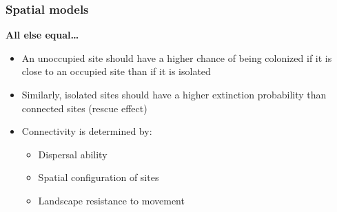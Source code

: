 \documentclass[color=usenames,dvipsnames]{beamer}\usepackage[]{graphicx}\usepackage[]{xcolor}
\begin{document}
\begin{frame}
  \frametitle{Spatial models}
  \large
  {\bf All else equal\dots}
  \begin{itemize}%
    \item An unoccupied site should have a higher chance of being
      colonized if it is close to an occupied site than if it is isolated
    \item<2-> Similarly, isolated sites should have a higher extinction
      probability than connected sites (rescue effect)
    \item<3-> Connectivity is determined by:
      \begin{itemize}
        \large
        \item<4-> Dispersal ability
        \item<4-> Spatial configuration of sites
        \item<4-> Landscape resistance to movement
      \end{itemize}
  \end{itemize}
\end{frame}



\end{document}
